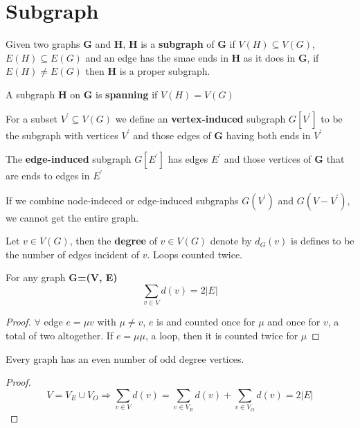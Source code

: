 	\section{Subgraph}
		Given two graphs \textbf{G} and \textbf{H}, \textbf{H} is a \textbf{subgraph} of \textbf{G} if $V(H)\subseteq V(G)$, $E(H)\subseteq E(G)$ and an edge has the smae ends in \textbf{H} as it does in \textbf{G}, if $E(H)\neq E(G)$ then \textbf{H} is a proper subgraph.

		A subgraph \textbf{H} on \textbf{G} is \textbf{spanning} if $V(H) = V(G)$

		For a subset $V^{'}\subseteq V(G)$ we define an \textbf{vertex-induced} subgraph $G[V^{'}]$ to be the subgraph with vertices $V^{'}$ and those edges of \textbf{G} having both ends in $V^{'}$

		The \textbf{edge-induced} subgraph $G[E^{'}]$ has edges $E^{'}$ and those vertices of \textbf{G} that are ends to edges in \textbf{$E^{'}$}

		If we combine node-indeced or edge-induced subgraphs $G(V^{'})$ and $G(V - V^{'})$, we cannot get the entire graph.

		Let $v\in V(G)$, then the \textbf{degree} of $v\in V(G)$ denote by $d_G(v)$ is defines to be the number of edges incident of $v$. Loops counted twice.

		\begin{theorem}
			For any graph \textbf{G=(V, E)}
			\begin{equation}
				\sum_{v\in V}d(v) = 2|E|
			\end{equation}			
		\end{theorem}

		\begin{proof}
			$\forall$ edge $e=\mu v$ with $\mu \neq v$, $e$ is  and counted once for $\mu$ and once for $v$, a total of two altogether. If $e=\mu \mu$, a loop, then it is counted twice for $\mu$			
		\end{proof}

		\begin{corollary}
			Every graph has an even number of odd degree vertices.
		\end{corollary}

		\begin{proof}
			\begin{equation}
				V = V_E\cup V_O \Rightarrow 
				\sum_{v\in V}d(v) = \sum_{v\in V_E} d(v) + \sum_{v\in V_O}d(v) = 2|E|
			\end{equation}			
		\end{proof}


